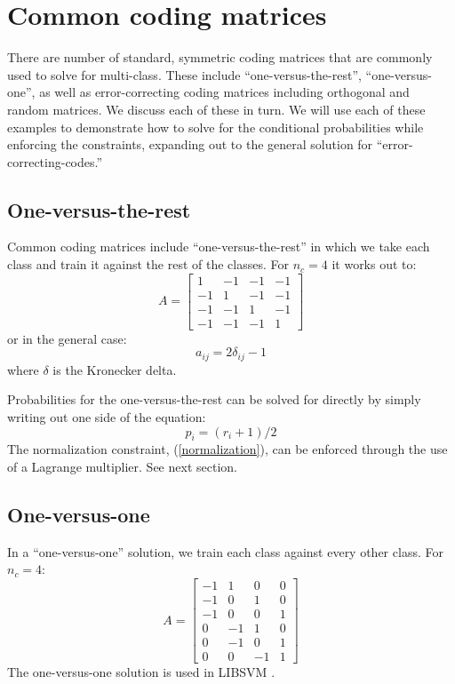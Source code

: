 \documentclass{article}
\begin{document}
\section{Common coding matrices}

There are number of standard, symmetric coding matrices that are commonly used
to solve for multi-class.
These include ``one-versus-the-rest'', ``one-versus-one'',
as well as error-correcting coding matrices including orthogonal and
random matrices.
We discuss each of these in turn.
We will use each of these examples to demonstrate how to solve for the
conditional probabilities while enforcing the constraints,
expanding out to the general solution for ``error-correcting-codes.''

\subsection{One-versus-the-rest}

Common coding matrices include ``one-versus-the-rest'' in which
we take each class and train it against the rest of the
classes.
For $n_c=4$ it works out to:
\begin{equation}
A = 
\begin{bmatrix}
1 & -1 & -1 & -1 \\
-1 & 1 & -1 & -1 \\
-1 & -1 & 1 & -1 \\
-1 & -1 & -1 & 1
\end{bmatrix}
\end{equation}
or in the general case:
\begin{equation}
	a_{ij}=2 \delta_{ij}-1
\end{equation}
where $\delta$ is the Kronecker delta.

Probabilities for the one-versus-the-rest can be solved for directly by
simply writing out one side of the equation:
\begin{equation}
	p_i = (r_i + 1)/2
\end{equation}
The normalization constraint, (\ref{normalization}), can be enforced 
through the use of a Lagrange multiplier. See next section.

\subsection{One-versus-one}

In a ``one-versus-one'' solution, we train each class against
every other class. For $n_c=4$:
\begin{equation}
A = 
\begin{bmatrix}
-1 & 1 & 0 & 0 \\
-1 & 0 & 1 & 0 \\
-1 & 0 & 0 & 1 \\
0 & -1 & 1 & 0 \\
0 & -1 & 0 & 1 \\
0 & 0 & -1 & 1
\end{bmatrix}
\end{equation}
The one-versus-one solution is used in LIBSVM \citep{Chang_Lin2011}.
\end{document}
